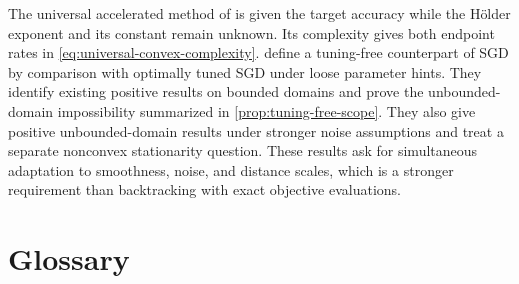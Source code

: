 \documentclass[11pt,twoside]{article}
\theoremstyle{definition}
\theoremstyle{remark}
\begin{document}
The universal accelerated method of \citet{nesterov2015} is given the target
accuracy while the H\"older exponent and its constant remain unknown. Its
complexity gives both endpoint rates in
\cref{eq:universal-convex-complexity}.  define a tuning-free
counterpart of SGD by comparison with optimally tuned SGD under loose
parameter hints. They identify existing positive results on bounded domains
and prove the unbounded-domain impossibility summarized in
\cref{prop:tuning-free-scope}. They also give positive unbounded-domain
results under stronger noise assumptions and treat a separate nonconvex
stationarity question. These results ask for simultaneous adaptation to
smoothness, noise, and distance scales, which is a stronger requirement than
backtracking with exact objective evaluations.

\section*{Glossary}
\end{document}
